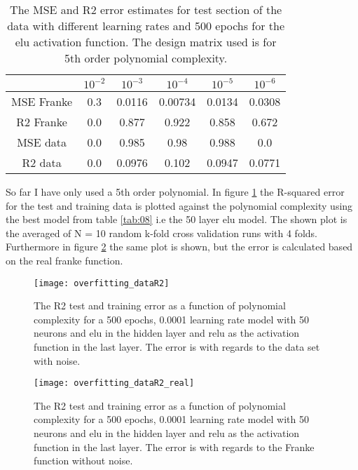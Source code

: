 \documentclass[uio,jmp,amsmath,amssymb,reprint,nofootinbib]{revtex4-1}
\numberwithin{equation}{section}
\begin{document}
\begin{table}[H]
\caption{The MSE and R2 error estimates for test section of the data with different learning rates and 500 epochs for the elu activation function. The design matrix used is for 5th order polynomial complexity.}
\begin{tabular}{|c|c|c|c|c|c|}\hline
 & \(10^{-2}\) & \(10^{-3}\) & \(10^{-4}\) & \(10^{-5}\) & \(10^{-6}\) \\ \hline
MSE Franke & 0.3 & 0.0116 & 0.00734 & 0.0134 & 0.0308 \\ \hline
R2 Franke & 0.0 & 0.877 & 0.922 & 0.858 & 0.672 \\ \hline
MSE data & 0.0 & 0.985 & 0.98 & 0.988 & 0.0 \\ \hline
R2 data & 0.0 & 0.0976 & 0.102 & 0.0947 & 0.0771 \\ \hline
\end{tabular}
\label{tab:09}
\end{table}

So far I have only used a 5th order polynomial. In figure \ref{fig:11} the R-squared error for the test and training data is plotted against the polynomial complexity using the best model from table \ref{tab:08} i.e the 50 layer elu model. The shown plot is the averaged of N = 10 random k-fold cross validation runs with 4 folds. Furthermore in figure \ref{fig:12} the same plot is shown, but the error is calculated based on the real franke function.

\begin{figure}[H]
    \centering
    \texttt{[image: overfitting\_dataR2]}
    \caption{The R2 test and training error as a function of polynomial complexity for a 500 epochs, 0.0001 learning rate model with 50 neurons and elu in the hidden layer and relu as the activation function in the last layer. The error is with regards to the data set with noise.}
    \label{fig:11}
\end{figure}

\begin{figure}[H]
    \centering
    \texttt{[image: overfitting\_dataR2\_real]}
    \caption{The R2 test and training error as a function of polynomial complexity for a 500 epochs, 0.0001 learning rate model with 50 neurons and elu in the hidden layer and relu as the activation function in the last layer. The error is with regards to the Franke function without noise.}
    \label{fig:12}
\end{figure}
\end{document}
